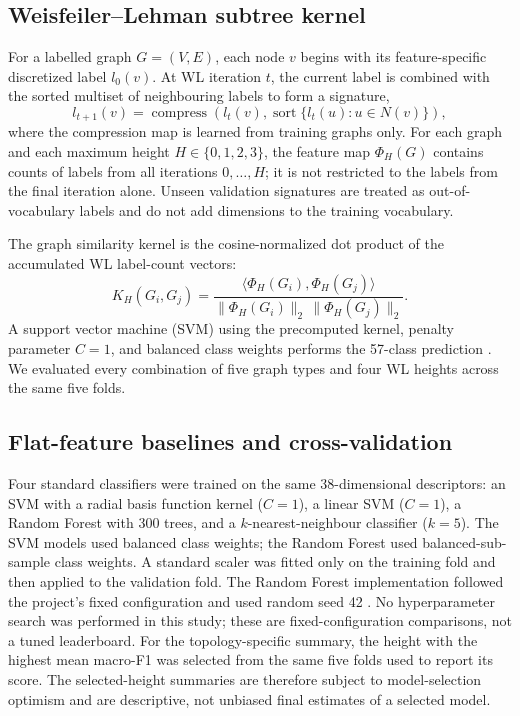 \documentclass[conference]{IEEEtran}
\begin{document}
\subsection{Weisfeiler--Lehman subtree kernel}

For a labelled graph $G=(V,E)$, each node $v$ begins with its feature-specific discretized label $l_0(v)$. At WL iteration $t$, the current label is combined with the sorted multiset of neighbouring labels to form a signature,
\begin{equation}
l_{t+1}(v)=\operatorname{compress}\!\left(l_t(v),\operatorname{sort}\{l_t(u):u\in N(v)\}\right),
\label{eq:wl}
\end{equation}
where the compression map is learned from training graphs only. For each graph and each maximum height $H\in\{0,1,2,3\}$, the feature map $\Phi_H(G)$ contains counts of labels from all iterations $0,\ldots,H$; it is not restricted to the labels from the final iteration alone. Unseen validation signatures are treated as out-of-vocabulary labels and do not add dimensions to the training vocabulary.

The graph similarity kernel is the cosine-normalized dot product of the accumulated WL label-count vectors:
\begin{equation}
K_H(G_i,G_j)=\frac{\langle\Phi_H(G_i),\Phi_H(G_j)\rangle}{\|\Phi_H(G_i)\|_2\,\|\Phi_H(G_j)\|_2}.
\label{eq:kernel}
\end{equation}
A support vector machine (SVM) using the precomputed kernel, penalty parameter $C=1$, and balanced class weights performs the 57-class prediction \cite{Cortes1995}. We evaluated every combination of five graph types and four WL heights across the same five folds.

\subsection{Flat-feature baselines and cross-validation}

Four standard classifiers were trained on the same 38-dimensional descriptors: an SVM with a radial basis function kernel ($C=1$), a linear SVM ($C=1$), a Random Forest with 300 trees, and a $k$-nearest-neighbour classifier ($k=5$). The SVM models used balanced class weights; the Random Forest used balanced-sub-sample class weights. A standard scaler was fitted only on the training fold and then applied to the validation fold. The Random Forest implementation followed the project's fixed configuration and used random seed 42 \cite{Breiman2001}. No hyperparameter search was performed in this study; these are fixed-configuration comparisons, not a tuned leaderboard. For the topology-specific summary, the height with the highest mean macro-F1 was selected from the same five folds used to report its score. The selected-height summaries are therefore subject to model-selection optimism and are descriptive, not unbiased final estimates of a selected model.
\end{document}
